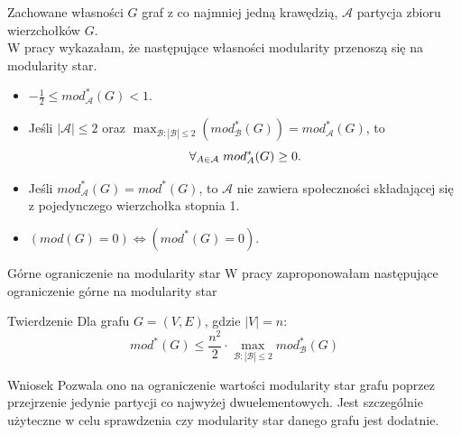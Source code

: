 \documentclass{beamer}
\begin{document}
\begin{frame}{Zachowane własności}
    \(G\) graf z co najmniej jedną krawędzią, \(\mathcal{A}\) partycja zbioru wierzchołków \(G\).\\
    \vspace{0.2cm}
    W pracy wykazałam, że następujące własności modularity przenoszą się na modularity star.
    \vspace{0.2cm}
    \begin{itemize}
        \item \(-\frac{1}{2} \leq mod_{\mathcal{A}}^*(G) < 1\).
        \item Jeśli \(|\mathcal{A}|\leq 2\)  oraz \(\displaystyle \max_{\mathcal{B}: |\mathcal{B}| \leq 2} (mod_{\mathcal{B}}^*(G)) = mod_{\mathcal{A}}^*(G)\), to
              \[\forall_{A \in \mathcal{A}} \hspace{1mm} mod_A^*(G) \geq 0 .\]
        \item Jeśli \(mod_{\mathcal{A}}^*(G) = mod^*(G)\), to \(\mathcal{A}\) nie zawiera społeczności składającej się z pojedynczego wierzchołka stopnia 1.
        \item \((mod(G) = 0) \Leftrightarrow (mod^*(G) = 0)\).
    \end{itemize}
\end{frame}

\begin{frame}{Górne ograniczenie na modularity star}
    W pracy zaproponowałam następujące ograniczenie górne na modularity star
    \begin{block}{Twierdzenie}
        Dla grafu \(G=(V,E)\), gdzie \(|V|=n\):
        \[ mod^*(G) \leq \frac{n^2}{2} \cdot \max_{\mathcal{B}:|\mathcal{B}|\leq 2} mod_{\mathcal{B}}^*(G) \]
    \end{block}
    \vspace{0.5cm}
    \begin{block}{Wniosek}
        Pozwala ono na ograniczenie wartości modularity star grafu poprzez przejrzenie jedynie partycji co najwyżej dwuelementowych. Jest szczególnie użyteczne w celu sprawdzenia czy modularity star danego grafu jest dodatnie.
    \end{block}

\end{frame}
\end{document}
